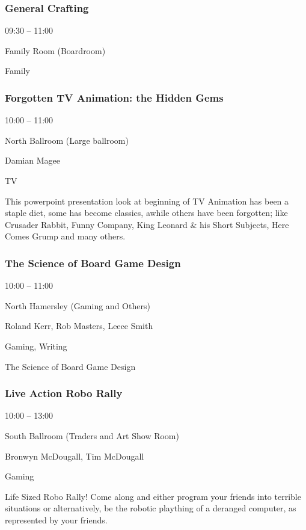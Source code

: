 \documentclass{scrreprt}
\begin{document}
\begin{multicols}{2}
\subsubsection*{General Crafting}\begin{description}
\setlength{\itemsep}{0pt}
\setlength{\parsep}{0pt}
\setlength{\parskip}{0pt}
\item[Time:]{09:30 -- 11:00}
\item[Venue:]{Family Room (Boardroom)}
\item[Tags:]{Family}\end{description}

\subsubsection*{Forgotten TV Animation: the Hidden Gems}\begin{description}
\setlength{\itemsep}{0pt}
\setlength{\parsep}{0pt}
\setlength{\parskip}{0pt}
\item[Time:]{10:00 -- 11:00}
\item[Venue:]{North Ballroom (Large ballroom)}
\item[People:]{Damian Magee}
\item[Tags:]{TV}\end{description}
This powerpoint presentation look at beginning of TV Animation has been a staple diet, some has become classics, awhile others have been forgotten; like Crusader Rabbit, Funny Company, King Leonard \& his Short Subjects, Here Comes Grump and many others.
\subsubsection*{The Science of Board Game Design}\begin{description}
\setlength{\itemsep}{0pt}
\setlength{\parsep}{0pt}
\setlength{\parskip}{0pt}
\item[Time:]{10:00 -- 11:00}
\item[Venue:]{North Hamersley (Gaming and Others)}
\item[People:]{Roland Kerr, Rob Masters, Leece Smith}
\item[Tags:]{Gaming, Writing}\end{description}
The Science of Board Game Design
\subsubsection*{Live Action Robo Rally}\begin{description}
\setlength{\itemsep}{0pt}
\setlength{\parsep}{0pt}
\setlength{\parskip}{0pt}
\item[Time:]{10:00 -- 13:00}
\item[Venue:]{South Ballroom (Traders and Art Show Room)}
\item[People:]{Bronwyn McDougall, Tim McDougall}
\item[Tags:]{Gaming}\end{description}
Life Sized Robo Rally! Come along and either program your friends into terrible situations or alternatively, be the robotic plaything of a deranged computer, as represented by your friends.

\end{multicols}
\end{document}
